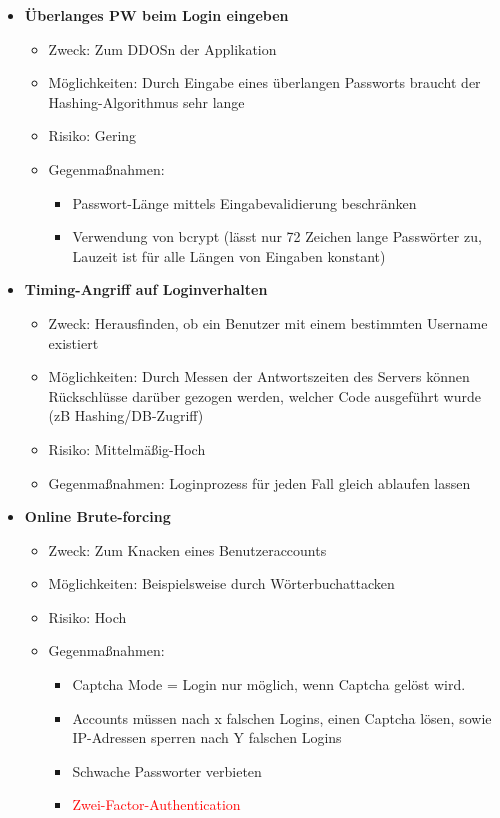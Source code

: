 \documentclass[12pt,DIV14,BCOR10mm,a4paper,parskip=half-,headsepline,headinclude,english,ngerman,bibliography=totocnumbered]{scrreprt}
\begin{document}
\begin{itemize}
  \item \textbf{Überlanges PW beim Login eingeben}
  \begin{itemize}
  \item Zweck: Zum DDOSn der Applikation
  \item Möglichkeiten: Durch Eingabe eines überlangen Passworts braucht der Hashing-Algorithmus sehr lange
  \item Risiko: Gering
  \item Gegenmaßnahmen:
  \begin{itemize}
  \item Passwort-Länge mittels Eingabevalidierung beschränken
  \item Verwendung von bcrypt (lässt nur 72 Zeichen lange Passwörter zu, Lauzeit ist für alle Längen von Eingaben konstant)
  \end{itemize}
\end{itemize}

  \item \textbf{Timing-Angriff auf Loginverhalten}
  \begin{itemize}
  \item Zweck: Herausfinden, ob ein Benutzer mit einem bestimmten Username existiert
  \item Möglichkeiten: Durch Messen der Antwortszeiten des Servers können Rückschlüsse darüber gezogen werden, welcher Code ausgeführt wurde (zB Hashing/DB-Zugriff)
  \item Risiko: Mittelmäßig-Hoch
  \item Gegenmaßnahmen: Loginprozess für jeden Fall gleich ablaufen lassen
  \end{itemize}

  \item \textbf{Online Brute-forcing}
  \begin{itemize}
  \item Zweck: Zum Knacken eines Benutzeraccounts
  \item Möglichkeiten: Beispielsweise durch Wörterbuchattacken
  \item Risiko: Hoch
  \item Gegenmaßnahmen:
  \begin{itemize}
      \item Captcha Mode = Login nur möglich, wenn Captcha gelöst wird.
      \item Accounts müssen nach x falschen Logins, einen Captcha lösen, sowie IP-Adressen sperren nach Y falschen Logins
      \item Schwache Passworter verbieten
      \item \textcolor{red}{Zwei-Factor-Authentication} %
    \end{itemize}
  \end{itemize}
\end{itemize}
\end{document}
